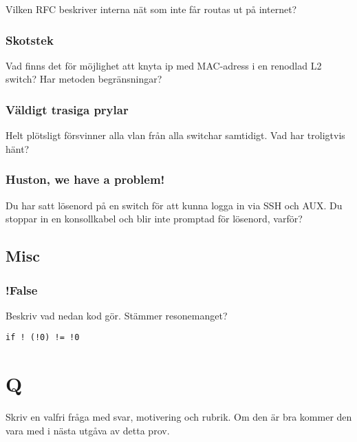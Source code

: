 Vilken RFC beskriver interna nät som inte får routas ut på internet?

\subsubsection{Skotstek}\label{skotstek}

Vad finns det för möjlighet att knyta ip med MAC-adress i en renodlad L2
switch? Har metoden begränsningar?

\subsubsection{Väldigt trasiga prylar}\label{vuxe4ldigt-trasiga-prylar}

Helt plötsligt försvinner alla vlan från alla switchar samtidigt. Vad
har troligtvis hänt?

\subsubsection{Huston, we have a
problem!}\label{huston-we-have-a-problem}

Du har satt lösenord på en switch för att kunna logga in via SSH och
AUX. Du stoppar in en konsollkabel och blir inte promptad för lösenord,
varför?

\subsection{Misc}\label{misc}

\subsubsection{!False}\label{false}

Beskriv vad nedan kod gör. Stämmer resonemanget?

\begin{verbatim}
if ! (!0) != !0
\end{verbatim}

\section{Q}\label{q}

Skriv en valfri fråga med svar, motivering och rubrik. Om den är bra
kommer den vara med i nästa utgåva av detta prov.
